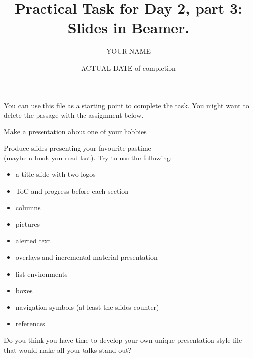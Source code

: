 \documentclass[11pt]{beamer}
\title{Practical Task for Day 2, part 3: Slides in Beamer.}
\author{YOUR NAME}
\date{ACTUAL DATE of completion} %
\begin{document}
	
	\begin{frame}{}
		
		\maketitle
		
	\end{frame}

	\begin{frame}[plain]{}
	
	You can use this file as a starting point to complete the task. You might want to delete the passage with the assignment below.
	
 	\end{frame}
 
	\begin{frame}{Make a presentation about one of your hobbies}
		
		Produce slides presenting your favourite pastime \\(maybe a book you read last). Try to use the following:
		
		
		\begin{itemize}
			\item a title slide with two logos
			\item ToC and progress before each section
			\item columns
			\item pictures
			\item alerted text
			\item overlays and incremental material presentation
			\item list environments
			\item boxes
			\item navigation symbols (at least the slides counter)
			\item references
		\end{itemize}
		Do you think you have time to develop your own unique presentation style file that would make all your talks stand out? 
		
	\end{frame}


	
\end{document}
